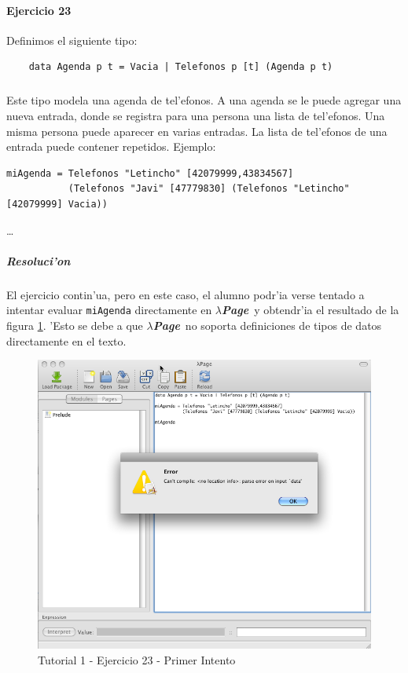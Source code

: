 \documentclass[a4paper]{article}
\newcommand{\hpage}{\textbf{\textsl{$\lambda$Page}}}
\begin{document}
\paragraph{Ejercicio 23}Definimos el siguiente tipo:
\begin{center}\begin{lstlisting}
	data Agenda p t = Vacia | Telefonos p [t] (Agenda p t)
\end{lstlisting}\end{center}
\subparagraph{}Este tipo modela una agenda de tel'efonos.  A una agenda se le puede agregar una nueva entrada, donde se registra para una persona una lista de tel'efonos.  Una misma persona puede aparecer en varias entradas.  La lista de tel'efonos de una entrada puede contener repetidos.  Ejemplo:
\begin{center}\begin{lstlisting}
miAgenda = Telefonos "Letincho" [42079999,43834567] 
           (Telefonos "Javi" [47779830] (Telefonos "Letincho" [42079999] Vacia)) 
\end{lstlisting}\end{center}
\ldots
\subparagraph{Resoluci'on}El ejercicio contin'ua, pero en este caso, el alumno podr'ia verse tentado a intentar evaluar \texttt{miAgenda} directamente en \hpage\ y obtendr'ia el resultado de la figura \ref{tut109}.  'Esto se debe a que \hpage\ no soporta definiciones de tipos de datos directamente en el texto.
\begin{figure}[hp]
	\begin{center}
        	\includegraphics[width=.75\textwidth]{pictures/tut1/09}
		\caption{Tutorial 1 - Ejercicio 23 - Primer Intento}
		\label{tut109}
	\end{center}
\end{figure}
\end{document}
